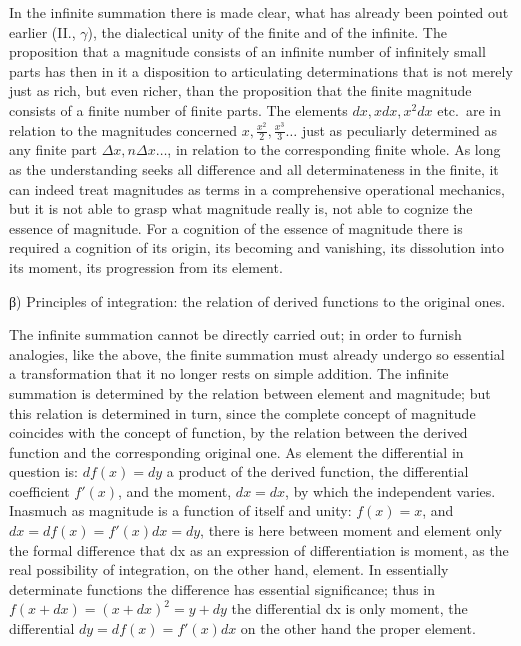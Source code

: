\documentclass[12pt,a4paper,openany]{book}
\newcommand{\opage}[1]{\marginnote{\footnotesize\textit{[#1]}}}
\begin{document}
In the infinite summation there is made clear, what has already been
pointed out earlier (II., $\gamma$), the dialectical unity of the finite and of the
infinite. The proposition that a magnitude consists of an infinite number of infinitely small parts
has then in it a disposition to articulating determinations that is not merely just as rich, but even richer,
than the proposition that
the finite magnitude consists of a finite number of finite
parts. The elements $dx, xdx, x^{2}dx$ etc.\ are in relation to
the magnitudes concerned $x, \frac{x^{2}}{2}, \frac{x^{3}}{3}\ldots$ just as peculiarly
determined as any finite part $\Delta x, n\Delta x\ldots$, in relation to the corresponding finite whole. As long as
the understanding seeks all difference and all determinateness in the finite,
it can indeed treat magnitudes as terms in a comprehensive
operational mechanics, but it is not able to
grasp what magnitude really is, not able to cognize
the essence of magnitude. For a cognition of the essence of magnitude
there is required a cognition of its origin, its becoming %
and vanishing, its dissolution into its moment, its
progression from its element.

\begin{center}β) Principles of integration: the relation of derived functions to the original ones.\end{center}

The infinite summation cannot be directly carried out;
in order to furnish analogies, like the above, the
finite summation must already undergo so essential a transformation
that it no longer rests on simple addition. The
\setcounter{footnote}{0}%
\opage{105}infinite summation is determined by the relation between element
and magnitude; but this relation is determined in turn, since the
complete concept of magnitude coincides with the concept of function,
by the relation between the derived function and
the corresponding original one. As element the differential in question
is: $d f(x)=dy$ a product of the derived
function, the differential coefficient $f'(x)$, and the moment, $dx=dx$, by which the independent varies. Inasmuch as
magnitude is a function of itself and unity: $f(x)=x$, and $dx=df(x)=f'(x)dx=dy$, there is here between moment
and element only the formal difference that dx as an expression of differentiation
is moment, as the real possibility of integration,
on the other hand, element. In essentially determinate functions
the difference has essential significance; thus in $f(x+dx)=(x+dx)^{2}=y+dy$ the differential dx is only moment, the differential $dy=df(x)=f'(x)dx$ on the other hand the proper
element.
\end{document}

